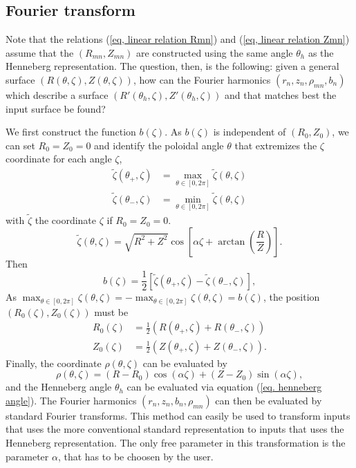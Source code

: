 \documentclass[my_thesis.tex]{subfiles}
\begin{document}
\subsection{Fourier transform}
Note that the relations (\ref{eq, linear relation Rmn}) and (\ref{eq, linear relation Zmn}) assume that the $(R_{mn},Z_{mn})$ are constructed using the same angle $\theta_h$ as the Henneberg representation. The question, then, is the following: given a general surface $(R(\theta,\zeta),Z(\theta,\zeta))$, how can the Fourier harmonics $(r_n,z_n,\rho_{mn},b_n)$ which describe a surface $(R'(\theta_h,\zeta),Z'(\theta_h,\zeta))$ and that matches best the input surface be found?

We first construct the function $b(\zeta)$. As $b(\zeta)$ is independent of $(R_0,Z_0)$, we can set $R_0=Z_0=0$ and identify the poloidal angle $\theta$ that extremizes the $\zeta$ coordinate for each angle $\zeta$,
\begin{align}
	\tilde\zeta(\theta_+,\zeta) &= \max_{\theta\in[0,2\pi]}\tilde\zeta(\theta,\zeta)\\
	\tilde\zeta(\theta_-,\zeta) &= \min_{\theta\in[0,2\pi]}\tilde\zeta(\theta,\zeta)
\end{align}
with $\tilde\zeta$ the coordinate $\zeta$ if $R_0=Z_0=0$.
\begin{equation}
	\tilde\zeta(\theta,\zeta) = \sqrt{R^2+Z^2}\cos\left[\alpha\zeta+\arctan\left(\frac{R}{Z}\right)\right].
\end{equation}
Then
\begin{equation}
	b(\zeta) = \frac{1}{2}\left[\tilde\zeta(\theta_+,\zeta)-\tilde\zeta(\theta_-,\zeta)\right],
\end{equation}
As $\max_{\theta\in[0,2\pi]}\zeta(\theta,\zeta)=-\max_{\theta\in[0,2\pi]}\zeta(\theta,\zeta)=b(\zeta)$, the position $(R_0(\zeta),Z_0(\zeta))$ must be 
\begin{align}
	R_0(\zeta) &= \frac{1}{2}\left(R(\theta_+,\zeta)+R(\theta_-,\zeta)\right)\\
	Z_0(\zeta) &= \frac{1}{2}\left(Z(\theta_+,\zeta)+Z(\theta_-,\zeta)\right).
\end{align}
Finally, the coordinate $\rho(\theta,\zeta)$ can be evaluated by
\begin{equation}
	\rho(\theta,\zeta) = (R-R_0)\cos(\alpha\zeta) + (Z-Z_0)\sin(\alpha\zeta),
\end{equation}
and the Henneberg angle $\theta_h$ can be evaluated via equation (\ref{eq. henneberg angle}). The Fourier harmonics $(r_n,z_n,b_n,\rho_{mn})$ can then be evaluated by standard Fourier transforms. This method can easily be used to transform inputs that uses the more conventional standard representation to inputs that uses the Henneberg representation. The only free parameter in this transformation is the parameter $\alpha$, that has to be choosen by the user. 
\end{document}
